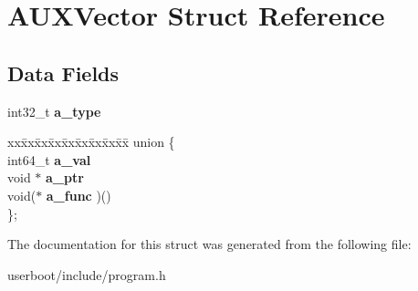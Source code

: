 \hypertarget{structAUXVector}{}\section{A\+U\+X\+Vector Struct Reference}
\label{structAUXVector}
\subsection*{Data Fields}
\begin{DoxyCompactItemize}
\item 
int32\+\_\+t {\bfseries a\+\_\+type}\hypertarget{structAUXVector_a7cf4e9191d265669af1278ef39606adf}{}\label{structAUXVector_a7cf4e9191d265669af1278ef39606adf}

\item 
\begin{tabbing}
xx\=xx\=xx\=xx\=xx\=xx\=xx\=xx\=xx\=\kill
union \{\\
\>int64\_t {\bfseries a\_val}\\
\>void $\ast$ {\bfseries a\_ptr}\\
\>void($\ast$ {\bfseries a\_func} )()\\
\}; \hypertarget{structAUXVector_a88e63771b7321dbb2ab47954d5574e7b}{}\label{structAUXVector_a88e63771b7321dbb2ab47954d5574e7b}
\\

\end{tabbing}\end{DoxyCompactItemize}


The documentation for this struct was generated from the following file\+:\begin{DoxyCompactItemize}
\item 
userboot/include/program.\+h\end{DoxyCompactItemize}
